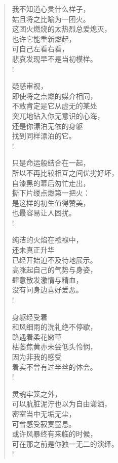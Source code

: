 \documentclass[UTF8, 12pt, a4paper]{ctexrep} %
\begin{document}
\begin{verse}

    我不知道心灵什么样子，\\
    姑且将之比喻为一团火。\\
    这团火燃烧的太热烈总爱熄灭，\\
    也许它能重新燃起，\\
    可自己左看右看，\\
    悲哀发现早不是当初模样。\\!
    
    疑惑审视，\\
    即使将之点燃的媒介相同，\\
    不敢肯定是它从虚无的某处\\
    突兀地钻入你无意识的心海，\\
    还是你漂泊无依的身躯\\
    找到同样漂泊的它。\\!
    
    只是命运般结合在一起，\\
    所以不再比较相互之间优劣好坏，\\
    自漆黑的幕后匆忙走出，\\
    撕下片缕点燃第一把火：\\
    是这样的初生值得赞美，\\
    也最容易让人困扰。\\!
    
    纯洁的火焰在襁褓中，\\
    还未真正升华\\
    已经开始迫不及待地展示。\\
    高涨起自己的气势与身姿，\\
    肆意散发激情与精血，\\
    没有问身边喜好爱恶。\\!
    
    身躯经受着\\
    和风细雨的洗礼绝不停歇，\\
    路遇着柔花嫩草\\
    枯萎焦黄亦未尝低头怜悯，\\
    因为非我的感受\\
    着实不曾有过半丝的体会。\\!
    
    灵魂牢笼之外，\\
    可以肮脏泥泞也以为自由潇洒，\\
    密室当中无垢无尘，\\
    可曾感受寂寞窒息。\\
    或许风暴终有来临的时候，\\
    可在那之前是你独一无二的演绎。\\!
    

\end{verse}
\end{document}
